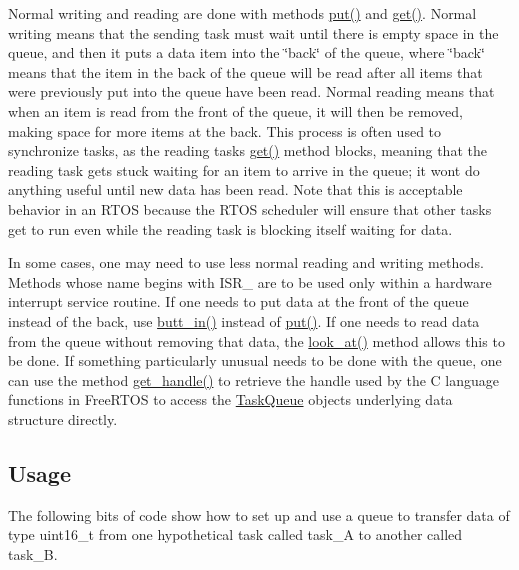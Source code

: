 Normal writing and reading are done with methods {\ttfamily \mbox{\hyperlink{class_task_queue_ad1dac62fcf253ab0cf50e47654c5fb29}{put()}}} and {\ttfamily \mbox{\hyperlink{class_task_queue_a8b696b7e87f4e1bb5cfde83f91dcef75}{get()}}}. Normal writing means that the sending task must wait until there is empty space in the queue, and then it puts a data item into the \char`\"{}back\char`\"{} of the queue, where \char`\"{}back\char`\"{} means that the item in the back of the queue will be read after all items that were previously put into the queue have been read. Normal reading means that when an item is read from the front of the queue, it will then be removed, making space for more items at the back. This process is often used to synchronize tasks, as the reading task\textquotesingle{}s {\ttfamily \mbox{\hyperlink{class_task_queue_a8b696b7e87f4e1bb5cfde83f91dcef75}{get()}}} method blocks, meaning that the reading task gets stuck waiting for an item to arrive in the queue; it won\textquotesingle{}t do anything useful until new data has been read. Note that this is acceptable behavior in an R\+T\+OS because the R\+T\+OS scheduler will ensure that other tasks get to run even while the reading task is blocking itself waiting for data.

In some cases, one may need to use less normal reading and writing methods. Methods whose name begins with {\ttfamily I\+S\+R\+\_\+} are to be used only within a hardware interrupt service routine. If one needs to put data at the front of the queue instead of the back, use {\ttfamily \mbox{\hyperlink{class_task_queue_a7c2810b4a2137dd88bc72fd1f20d18eb}{butt\+\_\+in()}}} instead of {\ttfamily \mbox{\hyperlink{class_task_queue_ad1dac62fcf253ab0cf50e47654c5fb29}{put()}}}. If one needs to read data from the queue without removing that data, the {\ttfamily \mbox{\hyperlink{class_task_queue_a696a695c31e089cf2361f8a16c2fefe6}{look\+\_\+at()}}} method allows this to be done. If something particularly unusual needs to be done with the queue, one can use the method {\ttfamily \mbox{\hyperlink{class_task_queue_a76d88ebf1c89534addd90863cb0a1015}{get\+\_\+handle()}}} to retrieve the handle used by the C language functions in Free\+R\+T\+OS to access the \mbox{\hyperlink{class_task_queue}{Task\+Queue}} object\textquotesingle{}s underlying data structure directly.\hypertarget{index_Usage}{}\subsection{Usage}\label{index_Usage}
The following bits of code show how to set up and use a queue to transfer data of type {\ttfamily uint16\+\_\+t} from one hypothetical task called {\ttfamily task\+\_\+A} to another called {\ttfamily task\+\_\+B}.

